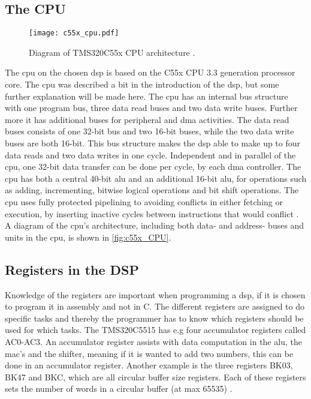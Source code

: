 \subsection{The CPU}
\begin{figure}[htbp!]
    \centering
        \texttt{[image: c55x\_cpu.pdf]}
        \caption{Diagram of TMS320C55x CPU architecture \citep{c55x_cpu}.}
        \label{fig:c55x_CPU}
  \end{figure}  
  
The \gls{cpu} on the chosen \gls{dsp} is based on the C55x CPU 3.3 generation processor core. The \gls{cpu} was described a bit in the introduction of the \gls{dsp}, but some further explanation will be made here. The \gls{cpu} has an internal bus structure with one program bus, three data read buses and two data write buses. Further more it has additional buses for peripheral and \gls{dma} activities. The data read buses consists of one 32-bit bus and two 16-bit buses, while the two data write buses are both 16-bit. This bus structure makes the \gls{dsp} able to make up to four data reads and two data writes in one cycle. Independent and in parallel of the \gls{cpu}, one 32-bit data transfer can be done per cycle, by each \gls{dma} controller. The \gls{cpu} has both a central 40-bit \gls{alu} and an additional 16-bit \gls{alu}, for operations such as adding, incrementing, bitwise logical operations and bit shift operations. 
The \gls{cpu} uses fully protected pipelining to avoiding conflicts in either fetching or execution, by inserting inactive cycles between instructions that would conflict \citep{c55x_cpu}.
A diagram of the \gls{cpu}'s architecture, including both data- and address- buses and units in the \gls{cpu}, is shown in \autoref{fig:c55x_CPU}.


  
\subsection{Registers in the DSP}
Knowledge of the registers are important when programming a \gls{dsp}, if it is chosen to program it in assembly and not in C. The different registers are assigned to do specific tasks and thereby the programmer has to know which registers should be used for which tasks. The TMS320C5515 has e.g four accumulator registers called AC0-AC3. An accumulator register assists with data computation in the \gls{alu}, the \gls{mac}'s and the shifter, meaning if it is wanted to add two numbers, this can be done in an accumulator register. 
Another example is the three registers BK03, BK47 and BKC, which are all circular buffer size registers. Each of these registers sets the number of words in a circular buffer (at max 65535) \citep{c55x_cpu}.  

